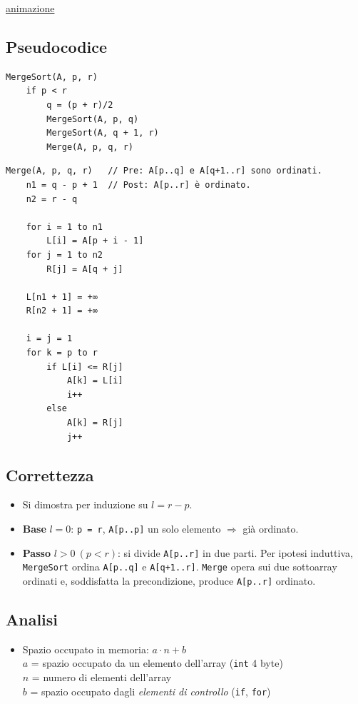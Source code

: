 \documentclass{article}
\begin{document}
\href{https://commons.wikimedia.org/wiki/File:Merge-sort-example-300px.gif}{animazione}

\subsection{Pseudocodice}

\begin{verbatim}
MergeSort(A, p, r)
    if p < r
        q = (p + r)/2
        MergeSort(A, p, q)
        MergeSort(A, q + 1, r)
        Merge(A, p, q, r)
\end{verbatim}

\begin{verbatim}
Merge(A, p, q, r)   // Pre: A[p..q] e A[q+1..r] sono ordinati.  
    n1 = q - p + 1  // Post: A[p..r] è ordinato.
    n2 = r - q

    for i = 1 to n1
        L[i] = A[p + i - 1]
    for j = 1 to n2
        R[j] = A[q + j]

    L[n1 + 1] = +∞
    R[n2 + 1] = +∞

    i = j = 1
    for k = p to r
        if L[i] <= R[j]
            A[k] = L[i]
            i++
        else
            A[k] = R[j]
            j++
\end{verbatim}

\subsection{Correttezza}

\begin{itemize}
    \item Si dimostra per induzione su $l = r-p$.
    \item \textbf{Base} $l=0$: \texttt{p = r}, \texttt{A[p..p]} un solo elemento $\Rightarrow$ già ordinato.
    \item \textbf{Passo} $l>0\ (p<r)$: si divide \texttt{A[p..r]} in due parti. Per ipotesi induttiva, \texttt{MergeSort} ordina \texttt{A[p..q]} e \texttt{A[q+1..r]}. \texttt{Merge} opera sui due sottoarray ordinati e, soddisfatta la precondizione, produce \texttt{A[p..r]} ordinato.
\end{itemize}

\subsection{Analisi}

\begin{itemize}
    \item Spazio occupato in memoria: $a\cdot n+b$ \\
    $a$ = spazio occupato da un elemento dell'array (\texttt{int} 4 byte) \\
    $n$ = numero di elementi dell'array \\
    $b$ = spazio occupato dagli \emph{elementi di controllo} (\texttt{if}, \texttt{for})
\end{itemize}
\end{document}
